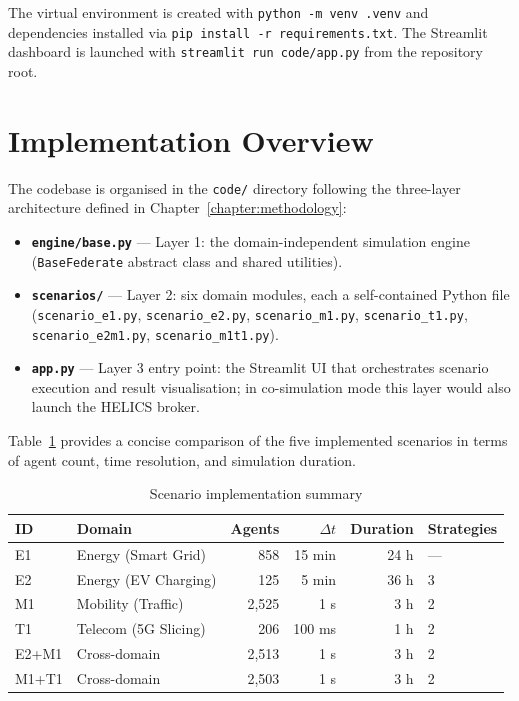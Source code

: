 The virtual environment is created with \texttt{python -m venv .venv} and dependencies installed via \texttt{pip install -r requirements.txt}. The Streamlit dashboard is launched with \texttt{streamlit run code/app.py} from the repository root.


\section{Implementation Overview}

The codebase is organised in the \texttt{code/} directory following the three-layer architecture defined in Chapter~\ref{chapter:methodology}:

\begin{itemize}
    \item \textbf{\texttt{engine/base.py}} — Layer 1: the domain-independent simulation engine (\texttt{BaseFederate} abstract class and shared utilities).
    \item \textbf{\texttt{scenarios/}} — Layer 2: six domain modules, each a self-contained Python file (\texttt{scenario\_e1.py}, \texttt{scenario\_e2.py}, \texttt{scenario\_m1.py}, \texttt{scenario\_t1.py}, \texttt{scenario\_e2m1.py}, \texttt{scenario\_m1t1.py}).
    \item \textbf{\texttt{app.py}} — Layer 3 entry point: the Streamlit UI that orchestrates scenario execution and result visualisation; in co-simulation mode this layer would also launch the HELICS broker.
\end{itemize}

Table~\ref{tab:scenarios_overview} provides a concise comparison of the five implemented scenarios in terms of agent count, time resolution, and simulation duration.

\begin{table}[h]
    \centering
    \caption{Scenario implementation summary}
    \label{tab:scenarios_overview}
    \begin{tabular}{llrrrl}
        \toprule
        \textbf{ID} & \textbf{Domain} & \textbf{Agents} & \textbf{$\Delta t$} & \textbf{Duration} & \textbf{Strategies} \\
        \midrule
        E1    & Energy (Smart Grid)    & 858   & 15 min  & 24 h  & — \\
        E2    & Energy (EV Charging)   & 125   & 5 min   & 36 h  & 3 \\
        M1    & Mobility (Traffic)     & 2{,}525 & 1 s   & 3 h   & 2 \\
        T1    & Telecom (5G Slicing)   & 206   & 100 ms  & 1 h   & 2 \\
        E2+M1 & Cross-domain           & 2{,}513 & 1 s   & 3 h   & 2 \\
        M1+T1 & Cross-domain           & 2{,}503 & 1 s   & 3 h   & 2 \\
        \bottomrule
    \end{tabular}
\end{table}


